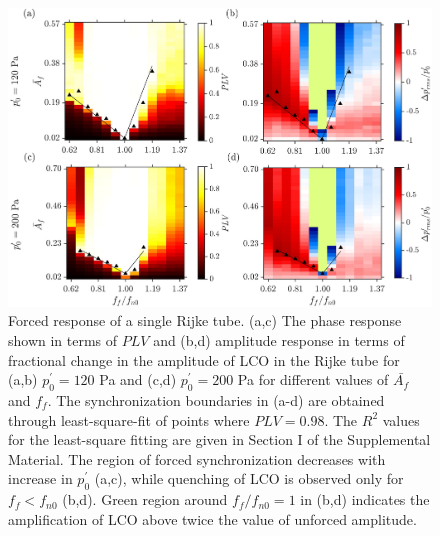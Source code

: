 \documentclass[%
preprint,
 amsmath,amssymb,
 aps,
 pra,
]{revtex4-2}
\begin{document}
\begin{figure}[t!]
\centering
\includegraphics[width=1\textwidth]{fig2.jpg}
\caption{\label{single_osc}Forced response of a single Rijke tube. (a,c) The phase response shown in terms of $PLV$ and (b,d) amplitude response in terms of fractional change in the amplitude of LCO in the Rijke tube for (a,b) $p^\prime_{0} = 120$ Pa and (c,d) $p^\prime_{0} = 200$ Pa for different values of $\bar{A_f}$ and $f_f$. The synchronization boundaries in (a-d) are obtained through least-square-fit of points where $PLV=0.98$. The $R^2$ values for the least-square fitting are given in Section I of the Supplemental Material. The region of forced synchronization decreases with increase in $p^\prime_{0}$ (a,c), while quenching of LCO is observed only for $f_f<f_{n0}$ (b,d). Green region  around $f_f/f_{n0} = 1$ in (b,d) indicates the amplification of LCO above twice the value of unforced amplitude. }
\end{figure}
\end{document}

